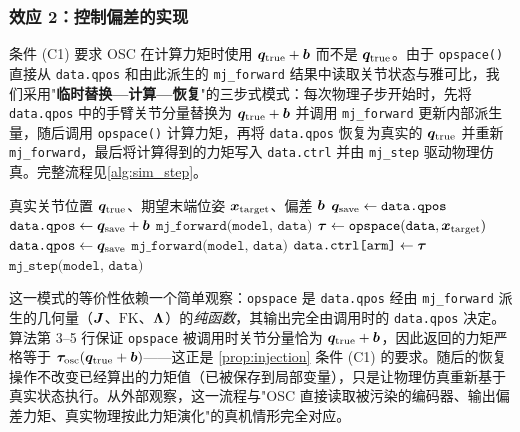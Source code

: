 \subsubsection*{效应 2：控制偏差的实现}\label{subsec:sim_effect2}

条件 (C1) 要求 OSC 在计算力矩时使用 $\bm{q}_{\text{true}} + \bm{b}$ 而不是 $\bm{q}_{\text{true}}$。由于 \texttt{opspace()} 直接从 \texttt{data.qpos} 和由此派生的 \texttt{mj\_forward} 结果中读取关节状态与雅可比，我们采用"\textbf{临时替换—计算—恢复}"的三步式模式：每次物理子步开始时，先将 \texttt{data.qpos} 中的手臂关节分量替换为 $\bm{q}_{\text{true}} + \bm{b}$ 并调用 \texttt{mj\_forward} 更新内部派生量，随后调用 \texttt{opspace()} 计算力矩，再将 \texttt{data.qpos} 恢复为真实的 $\bm{q}_{\text{true}}$ 并重新 \texttt{mj\_forward}，最后将计算得到的力矩写入 \texttt{data.ctrl} 并由 \texttt{mj\_step} 驱动物理仿真。完整流程见\cref{alg:sim_step}。

\begin{algorithm}[htbp]
  \caption{带编码器偏差的单控制步（$N$ 次物理子步）}
  \label{alg:sim_step}
  \begin{algorithmic}[1]
    \Require 真实关节位置 $\bm{q}_{\text{true}}$、期望末端位姿 $\bm{x}_{\text{target}}$、偏差 $\bm{b}$
      \State $\bm{q}_{\text{save}} \gets \texttt{data.qpos}$ 
      \State $\texttt{data.qpos} \gets \bm{q}_{\text{save}} + \bm{b}$ 
      \State $\texttt{mj\_forward(model, data)}$ 
      \State $\bm{\tau} \gets \texttt{opspace}(\texttt{data}, \bm{x}_{\text{target}})$ 
      \State $\texttt{data.qpos} \gets \bm{q}_{\text{save}}$ 
      \State $\texttt{mj\_forward(model, data)}$
      \State $\texttt{data.ctrl[arm]} \gets \bm{\tau}$ 
      \State $\texttt{mj\_step(model, data)}$ 
    \EndFor
  \end{algorithmic}
\end{algorithm}

这一模式的等价性依赖一个简单观察：\texttt{opspace} 是 \texttt{data.qpos} 经由 \texttt{mj\_forward} 派生的几何量（$\bm{J}$、$\text{FK}$、$\bm{\Lambda}$）的\emph{纯函数}，其输出完全由调用时的 \texttt{data.qpos} 决定。算法第 3--5 行保证 \texttt{opspace} 被调用时关节分量恰为 $\bm{q}_{\text{true}} + \bm{b}$，因此返回的力矩严格等于 $\bm{\tau}_{\text{osc}}(\bm{q}_{\text{true}} + \bm{b})$——这正是 \cref{prop:injection} 条件 (C1) 的要求。随后的恢复操作不改变已经算出的力矩值（已被保存到局部变量），只是让物理仿真重新基于真实状态执行。从外部观察，这一流程与"OSC 直接读取被污染的编码器、输出偏差力矩、真实物理按此力矩演化"的真机情形完全对应。

